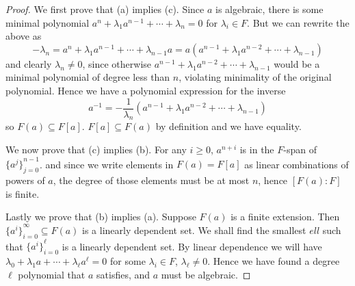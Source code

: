 \begin{proof}
    We first prove that (a) implies (c).
    Since \(a\) is algebraic, there is some minimal polynomial
    \(a^n + \lambda_1 a^{n-1} + \cdots + \lambda_n = 0\) for \(\lambda_i \in F\).
    But we can rewrite the above as
    \begin{equation*}
        -\lambda_n = a^n + \lambda_1 a^{n-1} + \cdots + \lambda_{n-1}a
        = a(a^{n-1} + \lambda_1 a^{n-2} + \cdots + \lambda_{n-1})
    \end{equation*}
    and clearly \(\lambda_n \neq 0\),
    since otherwise \(a^{n-1} + \lambda_1 a^{n-2} + \cdots + \lambda_{n-1}\)
    would be a minimal polynomial of degree less than \(n\),
    violating minimality of the original polynomial.
    Hence we have a polynomial expression for the inverse
    \begin{equation*}
        a^{-1} = -\frac{1}{\lambda_n}
        (a^{n-1} + \lambda_1 a^{n-2} + \cdots + \lambda_{n-1})
    \end{equation*}
    so \(F(a) \subseteq F[a]\).
    \(F[a] \subseteq F(a)\) by definition
    and we have equality.
    
    We now prove that (c) implies (b).
    For any \(i \geq 0\), \(a^{n+i}\) is in the \(F\)-span of \({\{a^j\}}_{j=0}^{n-1}\).
    and since we write elements in \(F(a) = F[a]\)
    as linear combinations of powers of \(a\),
    the degree of those elements must be at most \(n\),
    hence \([F(a):F]\) is finite.

    Lastly we prove that (b) implies (a).
    Suppose \(F(a)\) is a finite extension.
    Then \({\{a^i\}}_{i=0}^\infty \subseteq F(a)\) is a linearly dependent set.
    We shall find the smallest \(ell\) such that
    \({\{a^i\}}_{i=0}^\ell\) is a linearly dependent set.
    By linear dependence we will have
    \(\lambda_0 + \lambda_1 a + \cdots + \lambda_\ell a^\ell = 0\)
    for some \(\lambda_i \in F\), \(\lambda_\ell \neq 0\).
    Hence we have found a degree \(\ell\) polynomial that \(a\) satisfies,
    and \(a\) must be algebraic.
\end{proof}




